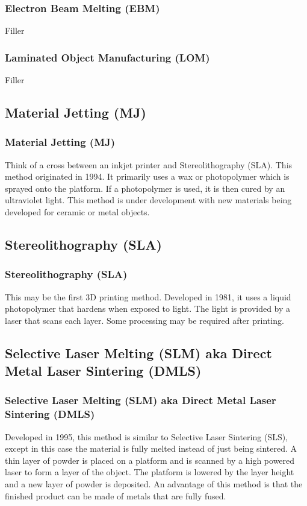 \documentclass[english,10pt]{beamer}
\begin{document}
\begin{frame}
  \frametitle{Electron Beam Melting (EBM)}
  Filler
\end{frame}

\begin{frame}
  \frametitle{Laminated Object Manufacturing (LOM)}
  Filler
\end{frame}

\subsection{Material Jetting (MJ)}
\begin{frame}
  \frametitle{Material Jetting (MJ)}
  Think of a cross between an inkjet printer and Stereolithography (SLA).  This method originated in 1994.  It primarily uses a wax or photopolymer which is sprayed onto the platform.  If a photopolymer is used, it is then cured by an ultraviolet light.  This method is under development with new materials being developed for ceramic or metal objects.
\end{frame}

\subsection{Stereolithography (SLA)}
\begin{frame}
  \frametitle{Stereolithography (SLA)}
  This may be the first 3D printing method.  Developed in 1981, it uses a liquid photopolymer that hardens when exposed to light.  The light is provided by a laser that scans each layer.  Some processing may be required after printing.
\end{frame}

\subsection{Selective Laser Melting (SLM) aka Direct Metal Laser Sintering (DMLS)}
\begin{frame}
  \frametitle{Selective Laser Melting (SLM) aka Direct Metal Laser Sintering (DMLS)}
  Developed in 1995, this method is similar to Selective Laser Sintering (SLS), except in this case the material is fully melted instead of just being sintered.    A thin layer of powder is placed on a platform and is scanned by a high powered laser to form a layer of the object.  The platform is lowered by the layer height and a new layer of powder is deposited.  An advantage of this method is that the finished product can be made of metals that are fully fused.
\end{frame}
\end{document}
